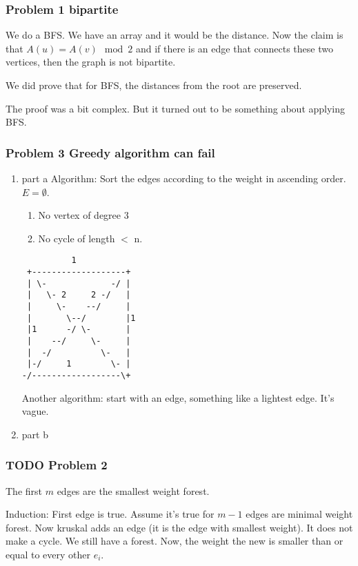 \documentclass[11pt]{article}
\begin{document}
\subsubsection{Problem 1 bipartite}
\label{sec:org439c66e}
We do a BFS. We have an array and it would be the distance. Now the claim is
that \(A(u) = A(v) \mod 2\) and if there is an edge that connects these two
vertices, then the graph is not bipartite.

We did prove that for BFS, the distances from the root are preserved.

The proof was a bit complex. But it turned out to be something about
applying BFS.
\subsubsection{Problem 3 Greedy algorithm can fail}
\label{sec:org44032e8}
\begin{enumerate}
\item part a
\label{sec:org3be5322}
Algorithm: Sort the edges according to the weight in ascending order. \(E =
     \emptyset\). 
\begin{enumerate}
\item No vertex of degree \(3\)
\item No cycle of length \(<\) n.
\end{enumerate}

\begin{verbatim}
          1
 +-------------------+
 | \-             -/ |
 |   \- 2     2 -/   |
 |     \-    --/     |
 |       \--/        |1
 |1      -/ \-       |
 |    --/     \-     |
 |  -/          \-   |
 |-/     1        \- |
-/------------------\+
\end{verbatim}

Another algorithm: start with an edge, something like a lightest edge. It's
vague.


\item part b
\label{sec:org593099a}
\end{enumerate}
\subsubsection{{\bfseries\sffamily TODO} Problem 2}
\label{sec:org2684f89}
The first \(m\) edges are the smallest weight forest.

Induction: First edge is true. Assume it's true for \(m-1\) edges are minimal
weight forest. Now kruskal adds an edge (it is the edge with smallest
weight). It does not make a cycle. We still have a forest. Now, the weight
the new is smaller than or equal to every other \(e_i\). 
\end{document}
